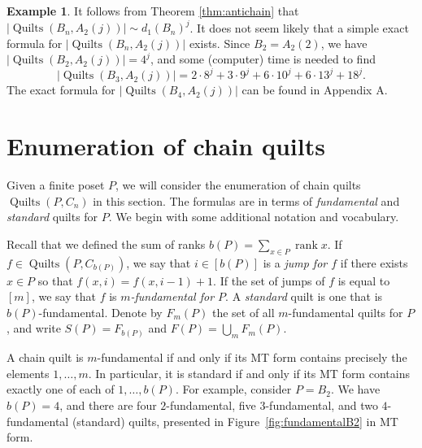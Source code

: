 \documentclass[12pt]{amsart}
\numberwithin{equation}{section}
\theoremstyle{definition}
\newtheorem{example}[theorem]{Example}
\newcommand{\quilt}{\operatorname{Quilts}}
\newcommand{\rank}{\operatorname{rank}}
\begin{document}
\begin{example}
It follows from Theorem \ref{thm:antichain} that $|\quilt(B_n,A_2(j))|
\sim d_1(B_n)^j$. It does not seem likely that a simple exact formula
for $|\quilt(B_n,A_2(j))|$ exists. Since $B_2 = A_2(2)$,
we have $|\quilt(B_2,A_2(j))| = 4^j$, and some (computer) time is needed to find
 $$|\quilt(B_3,A_2(j))| = 2 \cdot 8^j + 3 \cdot 9^j + 6 \cdot 10^j + 6 \cdot 13^j + 18^j.$$
The exact formula for $|\quilt(B_4,A_2(j))|$ can be found in 
Appendix A.
\end{example}

\section{Enumeration of chain quilts} \label{sec:chain}

Given a finite poset $P$, we will consider the enumeration of chain
quilts $\quilt(P,C_{n})$ in this section. The formulas are in terms
of \emph{fundamental} and \emph{standard} quilts for $P$.  We begin
with some additional notation and vocabulary.

Recall that we defined the sum of ranks $b(P) = \sum_{x \in P} \rank
x$. If $f \in \quilt(P,C_{b(P)})$, we say that $i \in [b(P)]$ is a
\emph{jump for $f$} if there exists $x \in P$ so that $f(x,i) =
f(x,i-1) + 1$. If the set of jumps of $f$ is equal to $[m]$, we say
that $f$ is \emph{$m$-fundamental for $P$}. A \emph{standard} quilt is
one that is $b(P)$-fundamental. Denote by $F_m(P)$ the set of all
$m$-fundamental quilts for $P$, and write $S(P) = F_{b(P)}$ and $F(P) =
\bigcup_m F_m(P)$.

A chain quilt is $m$-fundamental if and only if its MT form contains
precisely the elements $1,\ldots,m$. In particular, it is standard if
and only if its MT form contains exactly one of each of
$1,\ldots,b(P)$.  For example, consider $P = B_2$.  We have $b(P) =
4$, and there are four $2$-fundamental, five $3$-fundamental, and two
$4$-fundamental (standard) quilts, presented in
Figure~\ref{fig:fundamentalB2} in MT form.
\end{document}
